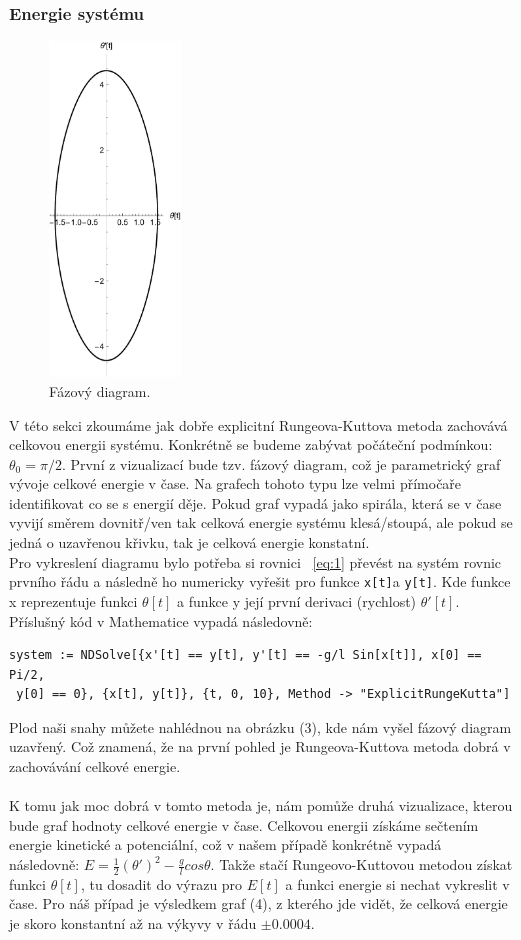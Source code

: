\documentclass[reqno, a4paper]{amsart}
\begin{document}
\subsubsection{Energie systému}
\label{sec:sys-energy}
\begin{figure}
\includegraphics[width=3.5cm]{Runge - Kutta, Fazovy diagram}
\caption*{Fázový diagram.}
\end{figure}
V této sekci zkoumáme jak dobře explicitní Rungeova-Kuttova metoda zachovává celkovou energii systému. Konkrétně se budeme zabývat počáteční podmínkou: $\theta_{0} = \pi /2$. První z vizualizací bude tzv. fázový diagram, což je parametrický graf vývoje celkové energie v čase. Na grafech tohoto typu lze velmi přímočaře identifikovat co se s energií děje. Pokud graf vypadá jako spirála, která se v čase vyvijí směrem dovnitř/ven tak celková energie systému klesá/stoupá, ale pokud se jedná o uzavřenou křivku, tak je celková energie konstatní.\\
Pro vykreslení diagramu bylo potřeba si rovnici ~\eqref{eq:1} převést na systém rovnic prvního řádu a následně ho numericky vyřešit pro funkce \verb|x[t]|a \verb|y[t]|. Kde funkce x reprezentuje funkci $\theta [t]$ a funkce y její první derivaci (rychlost) $\theta' [t]$. Příslušný kód v Mathematice vypadá následovně:
\begin{verbatim}
system := NDSolve[{x'[t] == y[t], y'[t] == -g/l Sin[x[t]], x[0] == Pi/2,
 y[0] == 0}, {x[t], y[t]}, {t, 0, 10}, Method -> "ExplicitRungeKutta"]
\end{verbatim}
Plod naši snahy můžete nahlédnou na obrázku (3), kde nám vyšel fázový diagram uzavřený. Což znamená, že na první pohled je Rungeova-Kuttova metoda dobrá v zachovávání celkové energie.\\ \\
K tomu jak moc dobrá v tomto metoda je, nám pomůže druhá vizualizace, kterou bude graf hodnoty celkové energie v čase. Celkovou energii získáme sečtením energie kinetické a potenciální, což v našem případě konkrétně vypadá následovně: $E = \frac{1}{2} (\theta')^2 - \frac{g}{l} cos \theta$. Takže stačí Rungeovo-Kuttovou metodou získat funkci $\theta[t]$, tu dosadit do výrazu pro $E[t]$ a funkci energie si nechat vykreslit v čase. Pro náš případ je výsledkem graf (4), z kterého jde vidět, že celková energie je skoro konstantní až na výkyvy v řádu $\pm 0.0004$.
\end{document}
